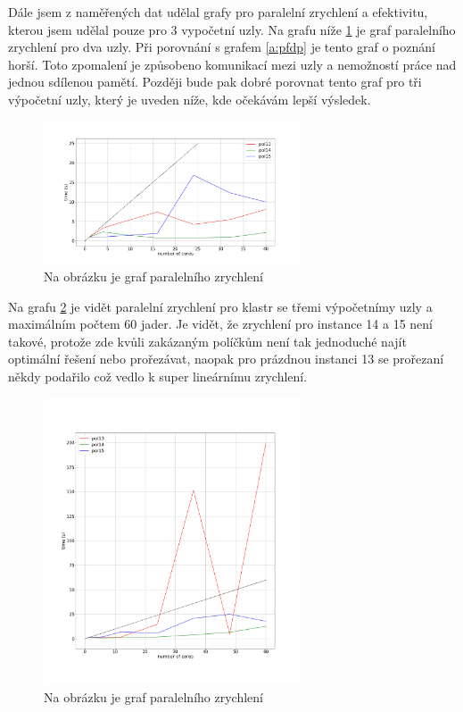 \documentclass[]{article}
\begin{document}
    
Dále jsem z naměřených dat udělal grafy pro paralelní zrychlení a efektivitu, kterou jsem udělal pouze pro 3 vypočetní uzly. Na grafu níže \ref{a:pfmpi2} je graf paralelního zrychlení pro dva uzly. Při porovnání s grafem \ref{a:pfdp} je tento graf o poznání horší. Toto zpomalení je způsobeno komunikací mezi uzly a nemožností práce nad jednou sdílenou pamětí. Později bude pak dobré porovnat tento graf pro tři výpočetní uzly, který je uveden níže, kde očekávám lepší výsledek.


\begin{figure}[H]\centering
	\includegraphics[width=0.68\textwidth]{img/parralelFastmpi2}
 	\caption{Na obrázku je graf paralelního zrychlení}\label{a:pfmpi2}
 \end{figure}
 
 Na grafu \ref{a:pfmpi3} je vidět paralelní zrychlení pro klastr se třemi výpočetnímy uzly a maximálním počtem 60 jader. Je vidět, že zrychlení pro instance 14 a 15 není takové, protože zde kvůli zakázaným políčkům není tak jednoduché najít optimální řešení nebo prořezávat, naopak pro prázdnou instanci 13 se prořezaní někdy podařilo což vedlo k super lineárnímu zrychlení.
 
 \begin{figure}[H]\centering
	\includegraphics[width=0.68\textwidth]{img/parralelFastmpi3}
 	\caption{Na obrázku je graf paralelního zrychlení}\label{a:pfmpi3}
 \end{figure}
\end{document}
